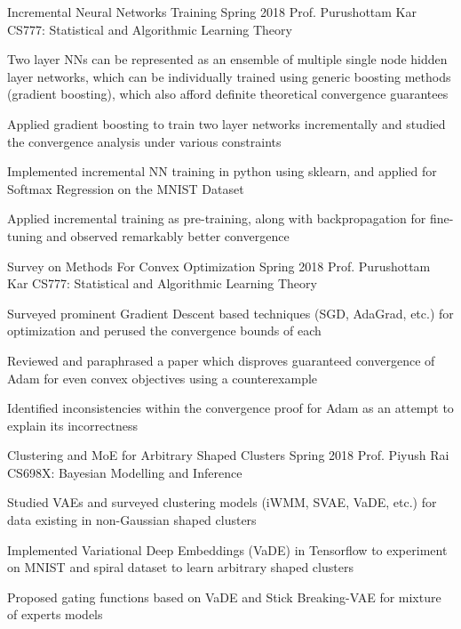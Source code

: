 \begin{cventries}
	\cventry
	{Incremental Neural Networks Training}
	{}
	{Spring 2018}
	{Prof. Purushottam Kar}
	{CS777: Statistical and Algorithmic Learning Theory}
	{
		\begin{cvitems}
		\item Two layer NNs can be represented as an ensemble of multiple single node hidden layer networks, which can be individually trained using generic boosting methods (gradient boosting), which also afford definite theoretical convergence guarantees
		\item Applied gradient boosting to train two layer networks incrementally and studied the convergence analysis under various constraints
		\item Implemented incremental NN training in python using sklearn, and applied for Softmax Regression on the MNIST Dataset
		\item Applied incremental training as pre-training, along with backpropagation for fine-tuning and observed remarkably better convergence
		\end{cvitems}
	}

	\cventry
	{Survey on Methods For Convex Optimization}
	{}
	{Spring 2018}
	{Prof. Purushottam Kar}
	{CS777: Statistical and Algorithmic Learning Theory}
	{
		\begin{cvitems}
		\item Surveyed prominent Gradient Descent based techniques (SGD, AdaGrad, etc.) for optimization and perused the convergence bounds of each
		\item Reviewed and paraphrased a paper which disproves guaranteed convergence of Adam for even convex objectives using a counterexample
		\item Identified inconsistencies within the convergence proof for Adam as an attempt to explain its incorrectness
		\end{cvitems}
	}

	\cventry
	{Clustering and MoE for Arbitrary Shaped Clusters}
	{}
	{Spring 2018}
	{Prof. Piyush Rai}
	{CS698X: Bayesian Modelling and Inference}
	{
		\begin{cvitems}
		\item Studied VAEs and surveyed clustering models (iWMM, SVAE, VaDE, etc.) for data existing in non-Gaussian shaped clusters
		\item Implemented Variational Deep Embeddings (VaDE) in Tensorflow to experiment on MNIST and spiral dataset to learn arbitrary shaped clusters
		\item Proposed gating functions based on VaDE and Stick Breaking-VAE for mixture of experts models
		\end{cvitems}
	}


\end{cventries}
